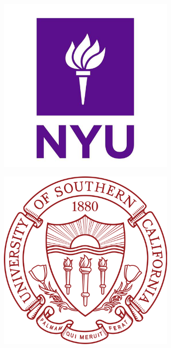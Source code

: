 \documentclass[landscape,a0a,final]{a0poster}
\begin{document}
\hspace*{-3.0in}
\begin{minipage}[c]{3.5in}%
\includegraphics[width=3.5in, trim={0 0 0 0},clip]{figures/NYU.png}
\end{minipage}
\hspace*{0.4in}
\begin{minipage}[c]{3.5in}%
\includegraphics[width=3.5in, trim={0 0 0 0},clip]{figures/usc.png}
\end{minipage}

\vspace*{3cm}

%
\vspace{0.5in} %

\end{document}
